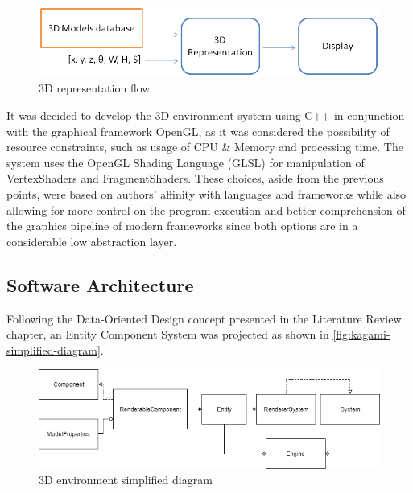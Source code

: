     \begin{figure}[H]
    \caption{
        \label{fig:3D-representation-flow}
            3D representation flow
        }
        \begin{center}
        \includegraphics[scale=0.65]{images/3D_representation.png}
        \end{center}
    \end{figure}
    
    It was decided to develop the 3D environment system using C++ in conjunction with the graphical framework OpenGL, as it was considered the possibility of resource constraints, such as usage of CPU \& Memory and processing time. The system uses the OpenGL Shading Language (GLSL) for manipulation of VertexShaders and FragmentShaders. These choices, aside from the previous points, were based on authors' affinity with languages and frameworks while also allowing for more control on the program execution and better comprehension of the graphics pipeline of modern frameworks since both options are in a considerable low abstraction layer.
    
\subsection{Software Architecture}
    
    Following the Data-Oriented Design concept presented in the Literature Review chapter, an Entity Component System was projected as shown in \autoref{fig:kagami-simplified-diagram}.
    
    \begin{figure}[H]
        \caption{
        \label{fig:kagami-simplified-diagram}
            3D environment simplified diagram
        }
        \begin{center}
        \includegraphics[scale=0.65]{images/kagami-simplified-diagram.png}
        \end{center}
    \end{figure}
    
